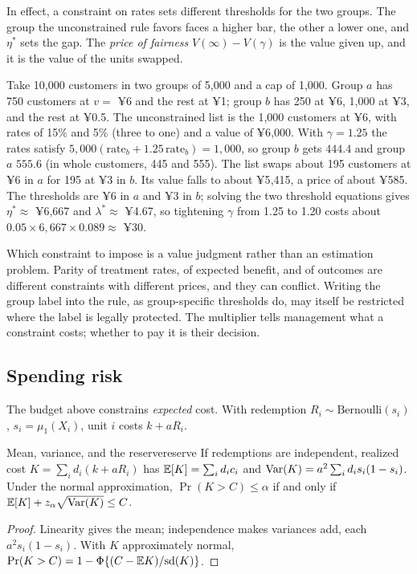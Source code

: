 \documentclass[11pt]{article}
\begin{document}
In effect, a constraint on rates sets different thresholds for the two groups. The group the unconstrained rule
favors faces a higher bar, the other a lower one, and $\eta^\ast$ sets the gap. The \emph{price of fairness}
$V(\infty) - V(\gamma)$ is the value given up, and it is the value of the units swapped.

Take 10{,}000 customers in two groups of 5{,}000 and a cap of 1{,}000. Group $a$ has 750 customers at $v = $ ¥6 and the rest
at ¥1; group $b$ has 250 at ¥6, 1{,}000 at ¥3, and the rest at ¥0.5. The unconstrained list is the 1{,}000 customers at ¥6,
with rates of 15\% and 5\% (three to one) and a value of ¥6{,}000. With $\gamma = 1.25$ the rates satisfy
$5{,}000(\text{rate}_b + 1.25\,\text{rate}_b) = 1{,}000$, so group $b$ gets $444.4$ and group $a$ $555.6$ (in whole customers,
445 and 555). The list swaps about 195 customers at ¥6 in $a$ for 195 at ¥3 in $b$. Its value falls to about ¥5{,}415, a
price of about ¥585. The thresholds are ¥6 in $a$ and ¥3 in $b$; solving the two threshold equations gives $\eta^\ast \approx$ ¥6{,}667 and $\lambda^\ast \approx$ ¥4.67, so tightening $\gamma$ from 1.25 to 1.20 costs about
$0.05 \times 6{,}667 \times 0.089 \approx$ ¥30.

Which constraint to impose is a value judgment rather than an estimation problem. Parity of treatment rates, of expected
benefit, and of outcomes are different constraints with different prices, and they can conflict. Writing the group label
into the rule, as group-specific thresholds do, may itself be restricted where the label is legally protected. The
multiplier tells management what a constraint costs; whether to pay it is their decision.

\subsection{Spending risk}

The budget above constrains \emph{expected} cost. With redemption $R_i \sim \text{Bernoulli}(s_i)$, $s_i = \mu_1(X_i)$, unit $i$
costs $k + aR_i$.

\begin{prop}{Mean, variance, and the reserve}{reserve}
If redemptions are independent, realized cost $K = \sum_i d_i(k + aR_i)$ has $\mathbb{E}[K] = \sum_i d_ic_i$ and
$\operatorname{Var}(K) = a^2\sum_i d_is_i(1-s_i)$. Under the normal approximation, $\Pr(K > C) \le \alpha$ if and only if
$\mathbb{E}[K] + z_\alpha\sqrt{\operatorname{Var}(K)} \le C$.
\end{prop}
\begin{proof}
Linearity gives the mean; independence makes variances add, each $a^2s_i(1-s_i)$. With $K$ approximately normal,
$\Pr(K > C) = 1 - \Phi\{(C - \mathbb{E} K)/\text{sd}(K)\}$.
\end{proof}
\end{document}
